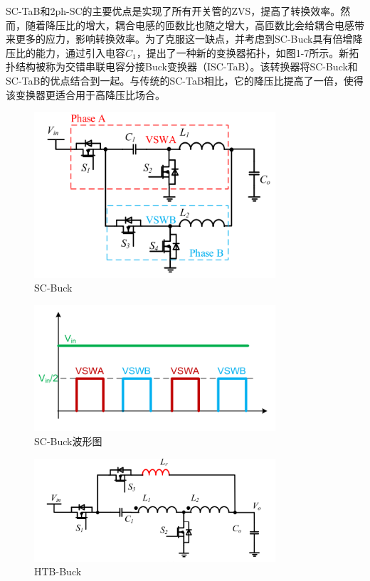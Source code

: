 \documentclass[12pt,a4paper]{report}
\begin{document}
SC-TaB和2ph-SC的主要优点是实现了所有开关管的ZVS，提高了转换效率。然而，随着降压比的增大，耦合电感的匝数比也随之增大，高匝数比会给耦合电感带来更多的应力，影响转换效率。为了克服这一缺点，并考虑到SC-Buck具有倍增降压比的能力，通过引入电容$C_1$，提出了一种新的变换器拓扑，如图1-7所示。新拓扑结构被称为交错串联电容分接Buck变换器（ISC-TaB）。该转换器将SC-Buck和SC-TaB的优点结合到一起。与传统的SC-TaB相比，它的降压比提高了一倍，使得该变换器更适合用于高降压比场合。
\begin{figure}[h]
    \centering
    \includegraphics[width = 0.8\textwidth]{figures/SC-Buck.png}
    \caption{SC-Buck}
\end{figure}
\begin{figure}[h]
    \centering
    \includegraphics[width = 0.8\textwidth]{figures/SC-Buck_v.png}
    \caption{SC-Buck波形图}
\end{figure}
\begin{figure}[h]
    \centering
    \includegraphics[width = 0.8\textwidth]{figures/HTB-Buck.png}
    \caption{HTB-Buck}
\end{figure}
\end{document}
